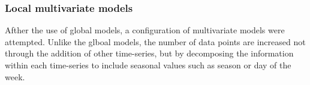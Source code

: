 %
%





\subsubsection{Local multivariate models}

Afther the use of global models, a configuration of multivariate models were attempted.
Unlike the glboal models,
the number of data points are increased not through the addition of other time-series,
but by decomposing the information within each time-series to include seasonal values such as season or day of the week.

